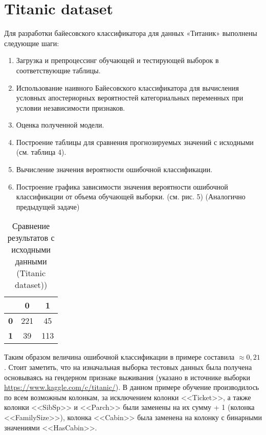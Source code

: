 \documentclass[]{article}
\numberwithin{equation}{section}
\begin{document}

    \section{Titanic dataset}

    Для разработки байесовского классификатора для данных «Титаник» выполнены следующие шаги:

    \begin{enumerate}
        \item Загрузка и препроцессинг обучающей и тестирующей выборок в соответствующие таблицы.
        \item Использование наивного Байесовского классификатора для вычисления условных апостериорных вероятностей категориальных переменных при условии независимости признаков.
        \item Оценка полученной модели.
        \item Построение таблицы для сравнения прогнозируемых значений с исходными (см. таблица 4).
        \item Вычисление значения вероятности ошибочной классификации.
        \item Построение графика зависимости значения вероятности ошибочной классификации от объема обучающей выборки. (см. рис. 5) (Аналогично предыдущей задаче)
    \end{enumerate}

    \begin{table}[H]
        \centering
        \begin{tabular}{|c|c|c|}
          \hline
            & \textbf{0} & \textbf{1} \\
          \hline
          \textbf{0} & 221 & 45\\
          \hline
          \textbf{1} & 39 & 113 \\
          \hline
        \end{tabular}
        \caption{Сравнение результатов с исходными данными (Titanic dataset))}
    \end{table}

    Таким образом величина ошибочной классификации в примере составила $\approx0,21$. Стоит заметить, что на изначальная выборка тестовых данных была получена основываясь на гендерном признаке выживания (указано в источнике выборки \href{https://www.kaggle.com/c/titanic/}{https://www.kaggle.com/c/titanic/}).
    В данном примере обучение производилось по всем возможным колонкам, за исключением колонки <<Ticket>>, а также колонки <<SibSp>> и <<Parch>> были заменены на их сумму + 1 (колонка <<FamilySize>>), колонка <<Cabin>> была заменена на колонку с бинарными значениями <<HasCabin>>.

\end{document}
